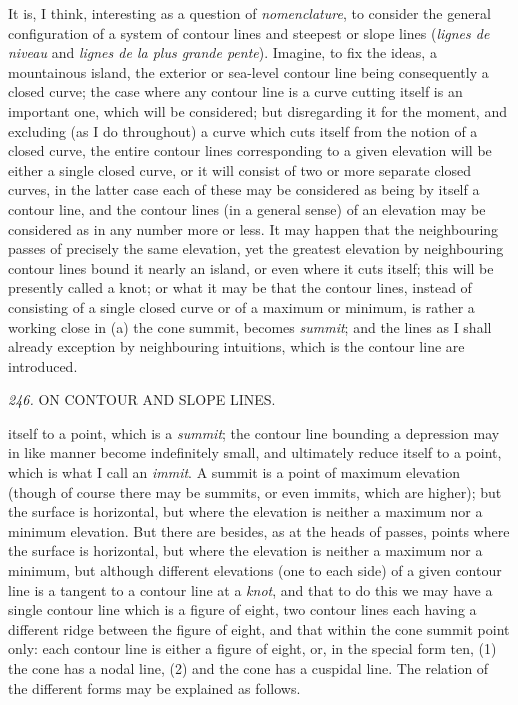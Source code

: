 \documentclass[11pt,a4paper]{book}
\begin{document}
\medskip

It is, I think, interesting as a question of \textit{nomenclature}, to consider the general configuration of a system of contour lines and steepest or slope lines (\textit{lignes de niveau} and \textit{lignes de la plus grande pente}). Imagine, to fix the ideas, a mountainous island, the exterior or sea-level contour line being consequently a closed curve; the case where any contour line is a curve cutting itself is an important one, which will be considered; but disregarding it for the moment, and excluding (as I do throughout) a curve which cuts itself from the notion of a closed curve, the entire contour lines corresponding to a given elevation will be either a single closed curve, or it will consist of two or more separate closed curves, in the latter case each of these may be considered as being by itself a contour line, and the contour lines (in a general sense) of an elevation may be considered as in any number more or less. It may happen that the neighbouring passes of precisely the same elevation, yet the greatest elevation by neighbouring contour lines bound it nearly an island, or even where it cuts itself; this will be presently called a knot; or what it may be that the contour lines, instead of consisting of a single closed curve or of a maximum or minimum, is rather a working close in (a) the cone summit, becomes \textit{summit}; and the lines as I shall already exception by neighbouring intuitions, which is the contour line are introduced.

\setcounter{page}{109}

\noindent\textit{246.} \quad ON CONTOUR AND SLOPE LINES.

itself to a point, which is a \textit{summit}; the contour line bounding a depression may in like manner become indefinitely small, and ultimately reduce itself to a point, which is what I call an \textit{immit}. A summit is a point of maximum elevation (though of course there may be summits, or even immits, which are higher); but the surface is horizontal, but where the elevation is neither a maximum nor a minimum elevation. But there are besides, as at the heads of passes, points where the surface is horizontal, but where the elevation is neither a maximum nor a minimum, but although different elevations (one to each side) of a given contour line is a tangent to a contour line at a \textit{knot}, and that to do this we may have a single contour line which is a figure of eight, two contour lines each having a different ridge between the figure of eight, and that within the cone summit point only: each contour line is either a figure of eight, or, in the special form ten, (1) the cone has a nodal line, (2) and the cone has a cuspidal line. The relation of the different forms may be explained as follows.
\end{document}
